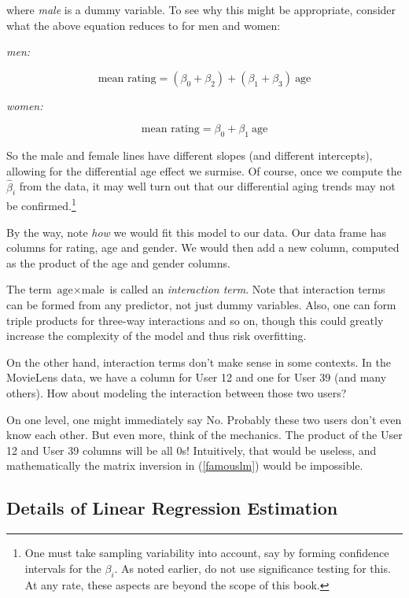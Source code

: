 where \textit{male} is a dummy variable.  To see why this might be
appropriate, consider what the above equation reduces to for men and
women:

\textit{men:}

\begin{equation}
\textrm{mean rating} 
= (\beta_0+\beta_2) + (\beta_1+\beta_3) ~ \textrm{age} 
\end{equation}

\textit{women:}

\begin{equation}
\textrm{mean rating} = \beta_0 + \beta_1 ~ \textrm{age} 
\end{equation}

So the male and female lines have different slopes (and different
intercepts), allowing for the differential age effect we surmise.
Of course, once we compute the $\widehat{\beta}_i$ from the data, it
may well turn out that our differential aging trends may not be
confirmed.\footnote{One must take sampling variability into account, say
by forming confidence intervals for the $\beta_i$.  As noted earlier, do
not use significance testing for this.  At any rate, these aspects are
beyond the scope of this book.}

By the way, note \textit{how} we would fit this model to our data.  Our
data frame has columns for rating, age and gender.  We would then add a
new column, computed as the product of the age and gender columns.

The term $\textrm{age} \times \textrm{male}$ is called an
\textit{interaction term}.  Note that interaction terms can be formed
from any predictor, not just dummy variables.  Also, one can form triple
products for three-way interactions and so on, though this could greatly
increase the complexity of the model and thus risk overfitting.

On the other hand, interaction terms don't make sense in some contexts.
In the MovieLens data, we have a column for User 12 and one for User 39
(and many others).  How about modeling the interaction between those two
users?

On one level, one might immediately say No.  Probably these two users
don't even know each other.  But even more, think of the mechanics.  The
product of the User 12 and User 39 columns will be all 0s!  Intuitively,
that would be useless, and mathematically the matrix inversion in
(\ref{famouslm}) would be impossible.

\subsection{Details of Linear Regression Estimation}
\label{lmdetails}

